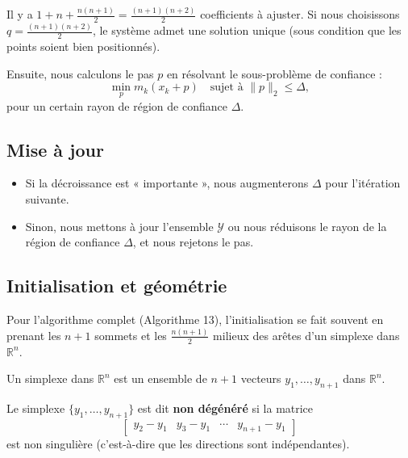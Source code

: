 Il y a $1 + n + \frac{n(n+1)}{2} = \frac{(n+1)(n+2)}{2}$ coefficients à ajuster.
Si nous choisissons $q = \frac{(n+1)(n+2)}{2}$, le système admet une solution unique (sous condition que les points soient bien positionnés).

Ensuite, nous calculons le pas $p$ en résolvant le sous-problème de confiance :
\begin{equation}
    \min_p m_k(x_k + p) \quad \text{sujet à } \|p\|_2 \le \Delta,
\end{equation}
pour un certain rayon de région de confiance $\Delta$.

\subsection{Mise à jour}
\begin{itemize}
    \item Si la décroissance est « importante », nous augmenterons $\Delta$ pour l'itération suivante.
    \item Sinon, nous mettons à jour l'ensemble $\mathcal{Y}$ ou nous réduisons le rayon de la région de confiance $\Delta$, et nous rejetons le pas.
\end{itemize}

\subsection{Initialisation et géométrie}
Pour l'algorithme complet (Algorithme 13), l'initialisation se fait souvent en prenant les $n+1$ sommets et les $\frac{n(n+1)}{2}$ milieux des arêtes d'un simplexe dans $\mathbb{R}^n$.

\begin{definition}[Simplexe]
    Un simplexe dans $\mathbb{R}^n$ est un ensemble de $n+1$ vecteurs $y_1, \dots, y_{n+1}$ dans $\mathbb{R}^n$.
    
    Le simplexe $\{y_1, \dots, y_{n+1}\}$ est dit \textbf{non dégénéré} si la matrice
    \[
        \begin{bmatrix}
            y_2 - y_1 & y_3 - y_1 & \cdots & y_{n+1} - y_1
        \end{bmatrix}
    \]
    est non singulière (c'est-à-dire que les directions sont indépendantes).
\end{definition}


